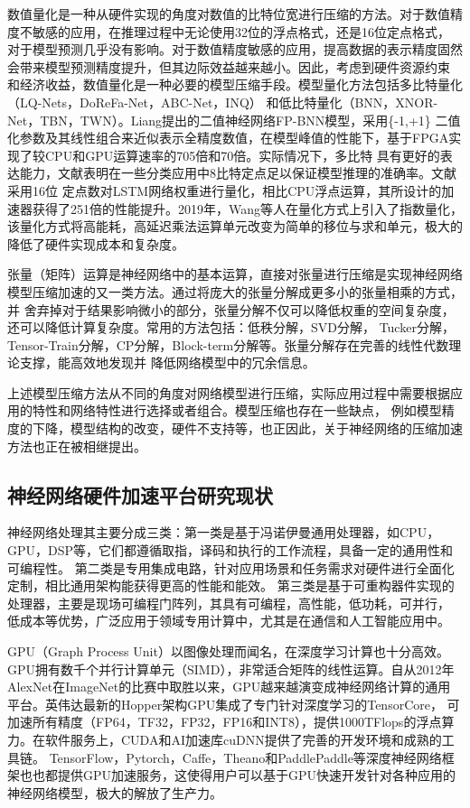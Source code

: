 数值量化是一种从硬件实现的角度对数值的比特位宽进行压缩的方法。对于数值精度不敏感的应用，在推理过程中无论使用32位的浮点格式，还是16位定点格式，
对于模型预测几乎没有影响。对于数值精度敏感的应用，提高数据的表示精度固然会带来模型预测精度提升，但其边际效益越来越小。因此，考虑到硬件资源约束
和经济收益，数值量化是一种必要的模型压缩手段。模型量化方法包括多比特量化（LQ-Nets\citing{}，DoReFa-Net\citing{}，ABC-Net\citing{}，INQ\citing{}）
和低比特量化（BNN\citing{}，XNOR-Net\citing{}，TBN\citing{}，TWN\citing{}）。Liang提出的二值神经网络FP-BNN模型，采用\{-1,+1\}
二值化参数及其线性组合来近似表示全精度数值，在模型峰值的性能下，基于FPGA实现了较CPU和GPU运算速率的705倍和70倍。实际情况下，多比特
具有更好的表达能力，文献表明在一些分类应用中8比特定点足以保证模型推理的准确率。文献采用16位
定点数对LSTM网络权重进行量化，相比CPU浮点运算，其所设计的加速器获得了251倍的性能提升。2019年，Wang等人在量化方式上引入了指数量化，
该量化方式将高能耗，高延迟乘法运算单元改变为简单的移位与求和单元，极大的降低了硬件实现成本和复杂度。

张量（矩阵）运算是神经网络中的基本运算，直接对张量进行压缩是实现神经网络模型压缩加速的又一类方法。通过将庞大的张量分解成更多小的张量相乘的方式，并
舍弃掉对于结果影响微小的部分，张量分解不仅可以降低权重的空间复杂度，还可以降低计算复杂度。常用的方法包括：低秩分解\citing{}，SVD分解\citing{}，
Tucker分解\citing{}，Tensor-Train分解\citing{}，CP分解\citing{}，Block-term分解\citing{}等。张量分解存在完善的线性代数理论支撑，能高效地发现并
降低网络模型中的冗余信息。

上述模型压缩方法从不同的角度对网络模型进行压缩，实际应用过程中需要根据应用的特性和网络特性进行选择或者组合。模型压缩也存在一些缺点，
例如模型精度的下降，模型结构的改变，硬件不支持等，也正因此，关于神经网络的压缩加速方法也正在被相继提出。

\subsection{神经网络硬件加速平台研究现状}
神经网络处理其主要分成三类：第一类是基于冯诺伊曼通用处理器，如CPU，GPU，DSP等，它们都遵循取指，译码和执行的工作流程，具备一定的通用性和可编程性。
第二类是专用集成电路，针对应用场景和任务需求对硬件进行全面化定制，相比通用架构能获得更高的性能和能效。
第三类是基于可重构器件实现的处理器，主要是现场可编程门阵列，其具有可编程，高性能，低功耗，可并行，
低成本等优势，广泛应用于领域专用计算中，尤其是在通信和人工智能应用中。

GPU（Graph Process Unit）以图像处理而闻名，在深度学习计算也十分高效。GPU拥有数千个并行计算单元（SIMD），非常适合矩阵的线性运算。自从2012年
AlexNet\citing{}在ImageNet的比赛中取胜以来，GPU越来越演变成神经网络计算的通用平台。英伟达最新的Hopper架构\citing{}GPU集成了专门针对深度学习的TensorCore，
可加速所有精度（FP64，TF32，FP32，FP16和INT8），提供1000TFlops的浮点算力。在软件服务上，CUDA和AI加速库cuDNN\citing{}提供了完善的开发环境和成熟的工具链。
TensorFlow，Pytorch，Caffe，Theano和PaddlePaddle等深度神经网络框架也也都提供GPU加速服务，这使得用户可以基于GPU快速开发针对各种应用的
神经网络模型，极大的解放了生产力。

